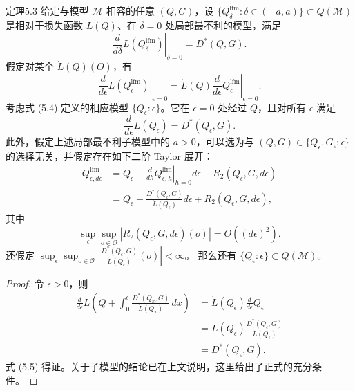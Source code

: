 \begin{bookresult}{定理}{5.3}
给定与模型 $\mathcal M$ 相容的任意 $(Q,G)$，设
$\{Q_\delta^{\mathrm{lfm}}:\delta\in(-a,a)\}\subset Q(\mathcal M)$
是相对于损失函数 $L(Q)$、在 $\delta=0$ 处局部最不利的模型，满足
\[
 \left.\frac{d}{d\delta}L(Q_\delta^{\mathrm{lfm}})\right|_{\delta=0}
 =D^*(Q,G).
\]
假定对某个 $\dot L(Q)(O)$，有
\[
 \left.\frac{d}{d\epsilon}L(Q_\epsilon^{\mathrm{lfm}})\right|_{\epsilon=0}
 =\dot L(Q)
 \left.\frac{d}{d\epsilon}Q_\epsilon^{\mathrm{lfm}}\right|_{\epsilon=0}.
\]
考虑式 (5.4) 定义的相应模型 $\{Q_\epsilon:\epsilon\}$。它在 $\epsilon=0$ 处经过 $Q$，且对所有 $\epsilon$ 满足
\begin{equation}
 \frac{d}{d\epsilon}L(Q_\epsilon)=D^*(Q_\epsilon,G).
 \tag{5.5}
\end{equation}
此外，假定上述局部最不利子模型中的 $a>0$，可以选为与
$(Q,G)\in\{Q_\epsilon,G_\epsilon:\epsilon\}$
的选择无关，并假定存在如下二阶 Taylor 展开：
\[
 \begin{aligned}
 Q_{\epsilon,d\epsilon}^{\mathrm{lfm}}
 &=Q_\epsilon+
 \left.\frac{d}{dh}Q_{\epsilon,h}^{\mathrm{lfm}}\right|_{h=0}
 d\epsilon+R_2(Q_\epsilon,G,d\epsilon)\\
 &=Q_\epsilon+\frac{D^*(Q_\epsilon,G)}{\dot L(Q_\epsilon)}
 d\epsilon+R_2(Q_\epsilon,G,d\epsilon),
 \end{aligned}
\]
其中
\[
 \sup_\epsilon\sup_{o\in\mathcal O}
 |R_2(Q_\epsilon,G,d\epsilon)(o)|=O((d\epsilon)^2).
\]
还假定
$\sup_\epsilon\sup_{o\in\mathcal O}
 \left|\frac{D^*(Q_\epsilon,G)}{\dot L(Q_\epsilon)}(o)\right|<\infty$。
那么还有 $\{Q_\epsilon:\epsilon\}\subset Q(\mathcal M)$。
\end{bookresult}

\begin{proof}
令 $\epsilon>0$，则
\[
 \begin{aligned}
 \frac{d}{d\epsilon}L\left(
 Q+\int_0^\epsilon\frac{D^*(Q_x,G)}{\dot L(Q_x)}\,dx
 \right)
 &=\dot L(Q_\epsilon)\frac{d}{d\epsilon}Q_\epsilon\\
 &=\dot L(Q_\epsilon)\frac{D^*(Q_\epsilon,G)}{\dot L(Q_\epsilon)}\\
 &=D^*(Q_\epsilon,G).
 \end{aligned}
\]
式 (5.5) 得证。关于子模型的结论已在上文说明，这里给出了正式的充分条件。
\end{proof}
